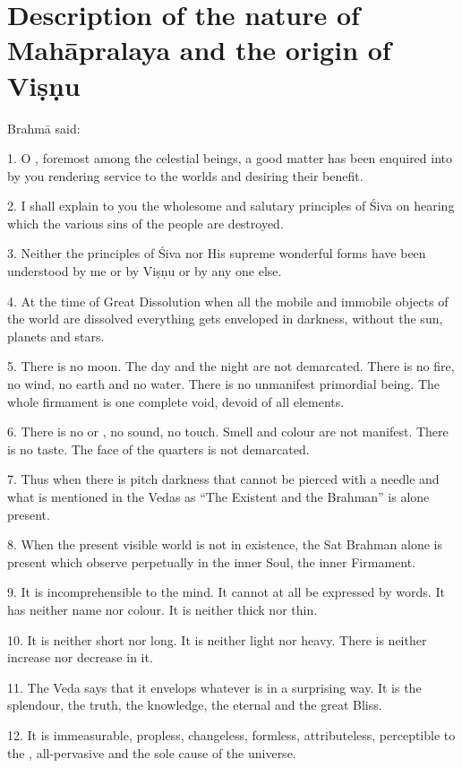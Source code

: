 \chapter{Description of the nature of Mahāpralaya and the origin of Viṣṇu}

Brahmā said:

1. O , foremost among the celestial beings, a good matter has been
enquired into by you rendering service to the worlds and desiring their benefit.

2. I shall explain to you the wholesome and salutary principles of Śiva on
hearing which the various sins of the people are destroyed.

3. Neither the principles of Śiva nor His supreme wonderful forms have been
understood by me or by Viṣṇu or by any one else.

4. At the time of Great Dissolution when all the mobile and immobile objects of
the world are dissolved everything gets enveloped in darkness, without the sun,
planets and stars.

5. There is no moon. The day and the night are not demarcated. There is no fire,
no wind, no earth and no water. There is no unmanifest primordial being.
The whole firmament is one complete void, devoid of all  elements.

6. There is no  or , no sound, no touch. Smell and colour
are not manifest. There is no taste. The face of the quarters is not demarcated.

7. Thus when there is pitch darkness that cannot be pierced with a needle and
what is mentioned in the Vedas as “The Existent and the Brahman” is alone
present.

8. When the present visible world is not in existence, the Sat Brahman alone is
present which  observe perpetually in the inner Soul,
the inner Firmament.

9. It is incomprehensible to the mind. It cannot at all be expressed by words.
It has neither name nor colour. It is neither thick nor thin.

10. It is neither short nor long. It is neither light nor heavy. There is
neither increase nor decrease in it.

11. The Veda says that it envelops whatever is in a surprising way. It is
the splendour, the truth, the knowledge, the eternal and the great Bliss.

12. It is immeasurable, propless, changeless, formless, attributeless,
perceptible to the , all-pervasive and the sole cause of the universe.

